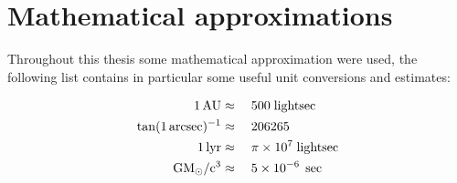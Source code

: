 \chapter{Mathematical approximations}

Throughout this thesis some mathematical approximation were used, the following
list contains in particular some useful unit conversions and estimates:

\begin{align}
    1\,\AU &\approx\quad 500\;\lightsec\eqlbl{au}\\
    \tan(1\,\arcsec)^{-1} &\approx\quad 206265\eqlbl{arcsectan}\\
    1\,\lyr &\approx\quad \pi \times 10^{7}\;\lightsec\eqlbl{lyr}\\
    \Grav\Msol/\lspeed^{3} &\approx\quad 5 \times 10^{-6}\;\sec\eqlbl{GMcinsec}
\end{align}